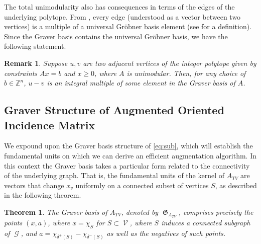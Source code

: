 \documentclass[pdflatex,sn-mathphys-num]{sn-jnl}%
\newtheorem{theorem}{Theorem}
\newtheorem{remark}{Remark}
\newcommand{\Z}{\mathbb{Z}} %
\DeclareMathOperator{\Gcal}{\mathcal{G}}
\DeclareMathOperator{\Ecal}{\mathcal{E}}
\DeclareMathOperator{\Scal}{\mathcal{S}}
\DeclareMathOperator{\Vcal}{\mathcal{V}}
\DeclareMathOperator{\Gfrak}{\mathfrak{G}}
\newcommand{\Dominic}[1]{\textcolor{blue}{[Dominic: #1]}}
\begin{document}
The total unimodularity also has consequences in terms of the edges of the underlying polytope. From \cite{sturmfels1997variation}, every edge (understood as a vector between two vertices) is a multiple of a universal Gr\"obner basis element (see \cite{sturmfels1997variation} for a definition). Since the Graver basis contains the universal Gr\"obner basis, we have the following statement.
\begin{remark}\label{rmk:edges-are-graver}
    Suppose $u,v$ are two adjacent vertices of the integer polytope given by constraints $Ax = b$ and $x \ge 0$, where $A$ is unimodular. Then, for any choice of $b \in \Z^n$, $u-v$ is an integral multiple of some element in the Graver basis of $A$.
\end{remark}

\subsection{Graver Structure of Augmented Oriented Incidence Matrix}
We expound upon the Graver basis structure of \eqref{eq:sub}, which will establish the fundamental units on which we can derive an efficient augmentation algorithm. In this context the Graver basis takes a particular form related to the connectivity of the underlying graph. That is, the fundamental units of the kernel of $A_{TV}$ are vectors that change $x_v$ uniformly on a connected subset of vertices $S$, as described in the following theorem.




\begin{theorem}\label{thm:graver-basis}
    The Graver basis of $A_{TV}$, denoted by $\Gfrak_{A_{TV}}$,  comprises precisely the points $(x,a)$, where $x = \chi_S$ for $S \subset \Vcal$, where $S$ induces a connected subgraph of $\Gcal$, and $a = \chi_{\delta^+(S)} - \chi_{\delta^-(S)}$ as well as the negatives of such points.
\end{theorem}
\end{document}
